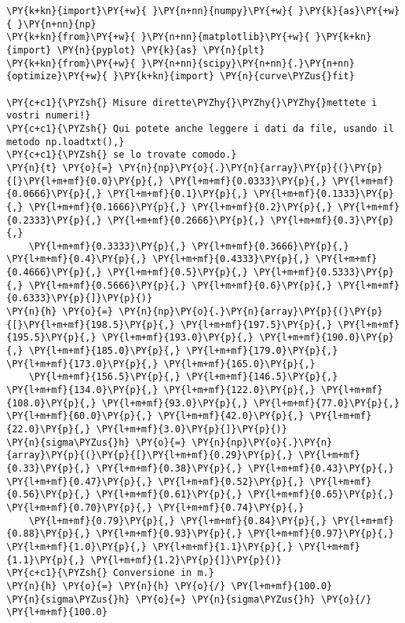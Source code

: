 \begin{Verbatim}[label=\makebox{\href{https://github.com/unipi-physics-labs/lab1-sheets/tree/main/snippy/dad_caduta.py}{https://github.com/.../dad\_caduta.py}},commandchars=\\\{\}]
\PY{k+kn}{import}\PY{+w}{ }\PY{n+nn}{numpy}\PY{+w}{ }\PY{k}{as}\PY{+w}{ }\PY{n+nn}{np}
\PY{k+kn}{from}\PY{+w}{ }\PY{n+nn}{matplotlib}\PY{+w}{ }\PY{k+kn}{import} \PY{n}{pyplot} \PY{k}{as} \PY{n}{plt}
\PY{k+kn}{from}\PY{+w}{ }\PY{n+nn}{scipy}\PY{n+nn}{.}\PY{n+nn}{optimize}\PY{+w}{ }\PY{k+kn}{import} \PY{n}{curve\PYZus{}fit}

\PY{c+c1}{\PYZsh{} Misure dirette\PYZhy{}\PYZhy{}\PYZhy{}mettete i vostri numeri!}
\PY{c+c1}{\PYZsh{} Qui potete anche leggere i dati da file, usando il metodo np.loadtxt(),}
\PY{c+c1}{\PYZsh{} se lo trovate comodo.}
\PY{n}{t} \PY{o}{=} \PY{n}{np}\PY{o}{.}\PY{n}{array}\PY{p}{(}\PY{p}{[}\PY{l+m+mf}{0.0}\PY{p}{,} \PY{l+m+mf}{0.0333}\PY{p}{,} \PY{l+m+mf}{0.0666}\PY{p}{,} \PY{l+m+mf}{0.1}\PY{p}{,} \PY{l+m+mf}{0.1333}\PY{p}{,} \PY{l+m+mf}{0.1666}\PY{p}{,} \PY{l+m+mf}{0.2}\PY{p}{,} \PY{l+m+mf}{0.2333}\PY{p}{,} \PY{l+m+mf}{0.2666}\PY{p}{,} \PY{l+m+mf}{0.3}\PY{p}{,}
    \PY{l+m+mf}{0.3333}\PY{p}{,} \PY{l+m+mf}{0.3666}\PY{p}{,} \PY{l+m+mf}{0.4}\PY{p}{,} \PY{l+m+mf}{0.4333}\PY{p}{,} \PY{l+m+mf}{0.4666}\PY{p}{,} \PY{l+m+mf}{0.5}\PY{p}{,} \PY{l+m+mf}{0.5333}\PY{p}{,} \PY{l+m+mf}{0.5666}\PY{p}{,} \PY{l+m+mf}{0.6}\PY{p}{,} \PY{l+m+mf}{0.6333}\PY{p}{]}\PY{p}{)}
\PY{n}{h} \PY{o}{=} \PY{n}{np}\PY{o}{.}\PY{n}{array}\PY{p}{(}\PY{p}{[}\PY{l+m+mf}{198.5}\PY{p}{,} \PY{l+m+mf}{197.5}\PY{p}{,} \PY{l+m+mf}{195.5}\PY{p}{,} \PY{l+m+mf}{193.0}\PY{p}{,} \PY{l+m+mf}{190.0}\PY{p}{,} \PY{l+m+mf}{185.0}\PY{p}{,} \PY{l+m+mf}{179.0}\PY{p}{,} \PY{l+m+mf}{173.0}\PY{p}{,} \PY{l+m+mf}{165.0}\PY{p}{,}
    \PY{l+m+mf}{156.5}\PY{p}{,} \PY{l+m+mf}{146.5}\PY{p}{,} \PY{l+m+mf}{134.0}\PY{p}{,} \PY{l+m+mf}{122.0}\PY{p}{,} \PY{l+m+mf}{108.0}\PY{p}{,} \PY{l+m+mf}{93.0}\PY{p}{,} \PY{l+m+mf}{77.0}\PY{p}{,} \PY{l+m+mf}{60.0}\PY{p}{,} \PY{l+m+mf}{42.0}\PY{p}{,} \PY{l+m+mf}{22.0}\PY{p}{,} \PY{l+m+mf}{3.0}\PY{p}{]}\PY{p}{)}
\PY{n}{sigma\PYZus{}h} \PY{o}{=} \PY{n}{np}\PY{o}{.}\PY{n}{array}\PY{p}{(}\PY{p}{[}\PY{l+m+mf}{0.29}\PY{p}{,} \PY{l+m+mf}{0.33}\PY{p}{,} \PY{l+m+mf}{0.38}\PY{p}{,} \PY{l+m+mf}{0.43}\PY{p}{,} \PY{l+m+mf}{0.47}\PY{p}{,} \PY{l+m+mf}{0.52}\PY{p}{,} \PY{l+m+mf}{0.56}\PY{p}{,} \PY{l+m+mf}{0.61}\PY{p}{,} \PY{l+m+mf}{0.65}\PY{p}{,} \PY{l+m+mf}{0.70}\PY{p}{,} \PY{l+m+mf}{0.74}\PY{p}{,}
    \PY{l+m+mf}{0.79}\PY{p}{,} \PY{l+m+mf}{0.84}\PY{p}{,} \PY{l+m+mf}{0.88}\PY{p}{,} \PY{l+m+mf}{0.93}\PY{p}{,} \PY{l+m+mf}{0.97}\PY{p}{,} \PY{l+m+mf}{1.0}\PY{p}{,} \PY{l+m+mf}{1.1}\PY{p}{,} \PY{l+m+mf}{1.1}\PY{p}{,} \PY{l+m+mf}{1.2}\PY{p}{]}\PY{p}{)}
\PY{c+c1}{\PYZsh{} Conversione in m.}
\PY{n}{h} \PY{o}{=} \PY{n}{h} \PY{o}{/} \PY{l+m+mf}{100.0}
\PY{n}{sigma\PYZus{}h} \PY{o}{=} \PY{n}{sigma\PYZus{}h} \PY{o}{/} \PY{l+m+mf}{100.0}


\end{Verbatim}
